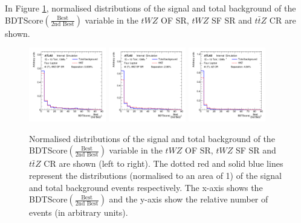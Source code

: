 In Figure \ref{fig:bdtscore-bestover2ndbest}, normalised distributions of the signal and total background of the BDTScore$(\frac{\text{Best}}{\text{2nd Best}})$ variable in the $tWZ$ OF SR, $tWZ$ SF SR and $t\bar{t}Z$ CR are shown.
\begin{figure}
    \centering
    \includegraphics[width=0.3\textwidth]{figures/bdtPlots/lep4_tWZ_4T_OF_BDT_Score_bestOver2ndBest_noExclusion.png}
    \includegraphics[width=0.3\textwidth]{figures/bdtPlots/lep4_tWZ_4T_SF_BDT_Score_bestOver2ndBest_noExclusion.png}
    \includegraphics[width=0.3\textwidth]{figures/bdtPlots/lep4_ttZ_4T_BDT_Score_bestOver2ndBest_noExclusion.png}
    \caption{Normalised distributions of the signal and total background of the BDTScore$(\frac{\text{Best}}{\text{2nd Best}})$ variable in the $tWZ$ OF SR, $tWZ$ SF SR and $t\bar{t}Z$ CR are shown (left to right). The dotted red and solid blue lines represent the distributions (normalised to an area of 1) of the signal and total background events respectively. The x-axis shows the BDTScore$(\frac{\text{Best}}{\text{2nd Best}})$ and the y-axis show the relative number of events (in arbitrary units).}
    \label{fig:bdtscore-bestover2ndbest}
\end{figure}

